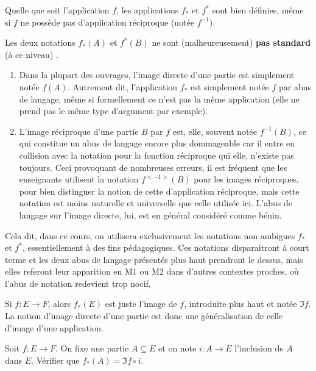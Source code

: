 \begin{attention}
Quelle que soit l'application $f$, les applications $f_*$ et $f^*$ sont bien définies, même si $f$ ne possède pas d'application réciproque (notée $f^{-1}$).
\end{attention}


\begin{attention}
Les deux notations $f_*(A)$ et $f^*(B)$ ne sont (malheureusement) \textbf{pas  standard} (à ce niveau)
.
\begin{enumerate}
\item Dans la plupart des ouvrages, l'image directe d'une partie est simplement notée $f(A)$. Autrement dit, l'application $f_*$ est simplement notée $f$ par abus de langage, même si formellement ce n'est pas la même application (elle ne prend pas le même type d'argument par exemple).
\item 
L'image réciproque d'une partie $B$ par $f$ est, elle, souvent notée $f^{-1}(B)$, ce qui constitue un abus de langage encore plus dommageable car il entre en collision avec la notation pour la fonction réciproque qui elle, n'existe pas toujours. Ceci provoquant de nombreuses erreurs, il est fréquent que les enseignants utilisent la notation $f^{<-1>}(B)$ pour les images réciproques, pour bien distinguer la notion de cette d'application réciproque, mais cette notation est moins naturelle et universelle que celle utilisée ici. L'abus de langage sur l'image directe, lui, est en général considéré comme bénin.
\end{enumerate}

Cela dit, dans ce cours, on utilisera exclusivement les notations non ambigues $f_*$ et $f^*$, essentiellement à des fins pédagogiques. Ces notations disparaitront à court terme et les deux abus de langage présentés plus haut prendront le dessus, mais elles referont leur apparition en M1 ou M2 dans d'autres contextes proches, où l'abus de notation redevient trop nocif.
\end{attention}

\begin{exemple}
Si $f : E\to F$, alors $f_*(E)$ est juste l'image de $f$, introduite plus haut et notée $\Im f$. La notion d'image directe d'une partie est donc une généralisation de celle d'image d'une application.
\end{exemple}

\begin{exercice}
Soit $f : E\to F$. On fixe une partie $A\subseteq E$ et on note $i : A\to E$ l'inclusion de $A$ dans $E$. Vérifier que $f_*(A) = \Im f\circ i$.
\end{exercice}



